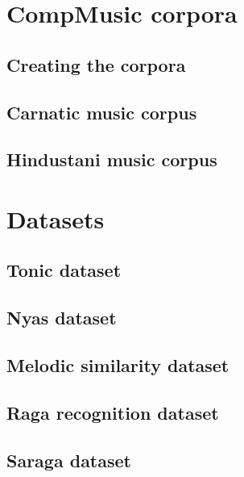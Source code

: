 \section{CompMusic corpora}

\subsection{Creating the corpora}

\subsection{Carnatic music corpus}

\subsection{Hindustani music corpus}

\section{Datasets}

\subsection{Tonic dataset}

\subsection{Nyas dataset}

\subsection{Melodic similarity dataset}

\subsection{Raga recognition dataset}

\subsection{Saraga dataset}








